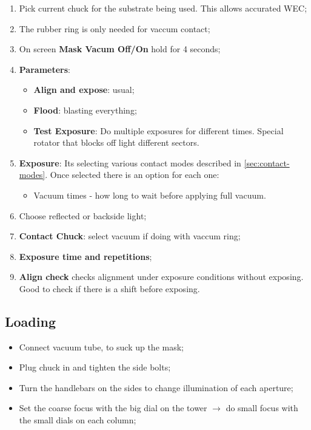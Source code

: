 \begin{enumerate}
  \item Pick current chuck for the substrate being used. This allows accurated
        WEC;
  \item The rubber ring is only needed for vaccum contact;
  \item On screen \textbf{Mask Vacum Off/On} hold for 4 seconds;
  \item \textbf{Parameters}:
        \begin{itemize}
          \item \textbf{Align and expose}: usual;
          \item \textbf{Flood}: blasting everything;
          \item \textbf{Test Exposure}: Do multiple exposures for different
                times. Special rotator that blocks off light different sectors.
        \end{itemize}
  \item \textbf{Exposure}: Its selecting various contact modes described in
        \autoref{sec:contact-modes}. Once selected there is an option for each
        one:
        \begin{itemize}
          \item Vacuum times - how long to wait before applying full vacuum.
        \end{itemize}
  \item Choose reflected or backside light;
  \item \textbf{Contact Chuck}: select vacuum if doing with vaccum ring;
  \item \textbf{Exposure time and repetitions};
  \item \textbf{Align check} checks alignment under exposure conditions without
        exposing. Good to check if there is a shift before exposing.
\end{enumerate}

\subsection{Loading}
\label{sec:loading}

\begin{itemize}
  \item Connect vacuum tube, to suck up the mask;
  \item Plug chuck in and tighten the side bolts;
  \item Turn the handlebars on the sides to change illumination of each
        aperture;
  \item Set the coarse focus with the big dial on the tower $\rightarrow$ do small focus
        with the small dials on each column;
\end{itemize}

